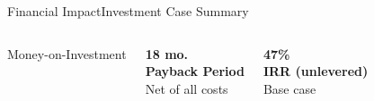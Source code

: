 \begin{frame}{Financial Impact}{Investment Case Summary}
\begin{columns}[T]
\begin{tcolorbox}[nexastat]
        \textcolor{NexaGray}{\scriptsize Money-on-Investment}
      \end{tcolorbox}
      \begin{tcolorbox}[nexastat]
        \centering
        \textcolor{NexaGold}{\textbf{\large 18 mo.}}\\[2pt]
        \textcolor{NexaWhite}{\small\textbf{Payback Period}}\\[1pt]
        \textcolor{NexaGray}{\scriptsize Net of all costs}
      \end{tcolorbox}
      \begin{tcolorbox}[nexastat]
        \centering
        \textcolor{NexaGold}{\textbf{\large 47\%}}\\[2pt]
        \textcolor{NexaWhite}{\small\textbf{IRR (unlevered)}}\\[1pt]
        \textcolor{NexaGray}{\scriptsize Base case}
      \end{tcolorbox}
  \end{columns}
\end{frame}
